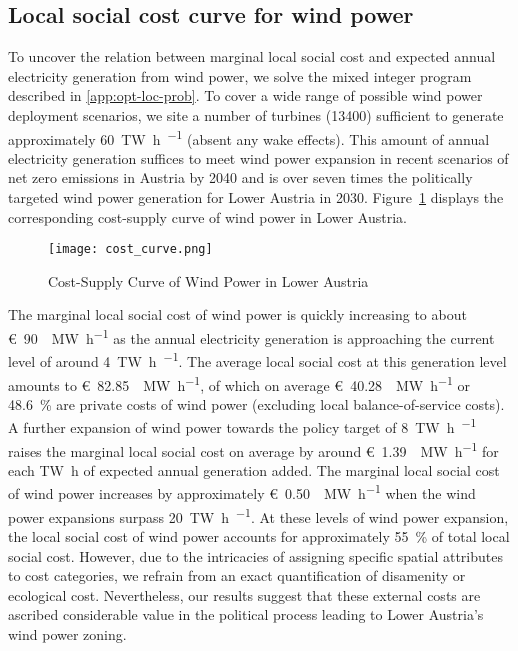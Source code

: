 \documentclass[review, a4paper, 12pt, authoryear, times]{elsarticle}
\begin{document}
\subsection{Local social cost curve for wind power} \label{subsec:cost-curve}
To uncover the relation between marginal local social cost and expected annual electricity generation from wind power, we solve the mixed integer program described in \ref{app:opt-loc-prob}.
To cover a wide range of possible wind power deployment scenarios, we site a number of turbines (\num{13400}) sufficient to generate approximately \SI{60}{\tera\watt\hour\per\year} (absent any wake effects).
This amount of annual electricity generation suffices to meet wind power expansion in recent scenarios of net zero emissions in Austria by 2040 \citep{NetZero2040} and is over seven times the politically targeted wind power generation for Lower Austria in 2030.
Figure~\ref{fig:cost-curve} displays the corresponding cost-supply curve of wind power in Lower Austria. 
%
\begin{figure}
    \centering
    \texttt{[image: cost\_curve.png]}
    \caption{Cost-Supply Curve of Wind Power in Lower Austria}
    \label{fig:cost-curve}
\end{figure}

The marginal local social cost of wind power is quickly increasing to about \SI{90}[\euro]{\per\mega\watt\per\hour} as the annual electricity generation is approaching the current level of around \SI{4}{\tera\watt\hour\per\year}.
The average local social cost at this generation level amounts to \SI{82.85}[\euro]{\per\mega\watt\per\hour}, of which on average \SI{40.28}[\euro]{\per\mega\watt\per\hour} or \SI{48.6}{\percent} are private costs of wind power (excluding local balance-of-service costs).
A further expansion of wind power towards the policy target of \SI{8}{\tera\watt\hour\per\year} raises the marginal local social cost on average by around \SI{1.39}[\euro]{\per\mega\watt\per\hour} for each \si{\tera\watt\hour} of expected annual generation added.
The marginal local social cost of wind power increases by approximately \SI{0.50}[\euro]{\per\mega\watt\per\hour} when the wind power expansions surpass \SI{20}{\tera\watt\hour\per\year}.
At these levels of wind power expansion, the local social cost of wind power accounts for approximately \SI{55}{\percent} of total local social cost.
However, due to the intricacies of assigning specific spatial attributes to cost categories, we refrain from an exact quantification of disamenity or ecological cost.
Nevertheless, our results suggest that these external costs are ascribed considerable value in the political process leading to Lower Austria's wind power zoning.
\end{document}
